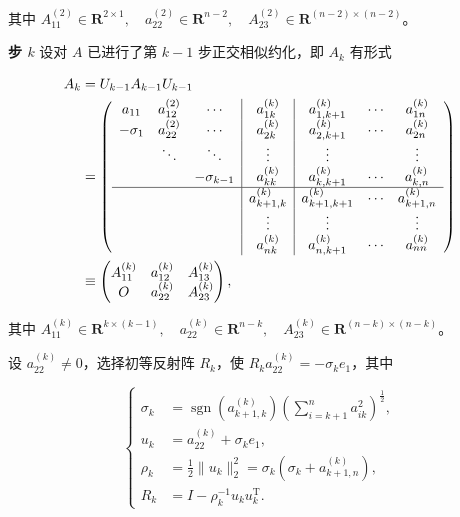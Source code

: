 其中 \(A_{11}^{(2)}\in\mathbf R^{2\times1},\quad a_{22}^{(2)}\in\mathbf R^{n-2},\quad A_{23}^{(2)}\in\mathbf R^{(n-2)\times(n-2)}\)。

\textbf{步 \(k\)} 设对 \(A\) 已进行了第 \(k-1\) 步正交相似约化，即 \(A_k\) 有形式

\[
\begin{aligned}
A_k&=U_{k-1}A_{k-1}U_{k-1}\\
&=\left(\begin{array}{ccc|c|ccc}
a_{11}&a_{12}^{(2)}&\cdots&a_{1k}^{(k)}&a_{1,k+1}^{(k)}&\cdots&a_{1n}^{(k)}\\
-\sigma_1&a_{22}^{(2)}&\cdots&a_{2k}^{(k)}&a_{2,k+1}^{(k)}&\cdots&a_{2n}^{(k)}\\
&\ddots&\ddots&\vdots&\vdots&&\vdots\\
&&-\sigma_{k-1}&a_{kk}^{(k)}&a_{k,k+1}^{(k)}&\cdots&a_{k,n}^{(k)}\\\hline
&&&a_{k+1,k}^{(k)}&a_{k+1,k+1}^{(k)}&\cdots&a_{k+1,n}^{(k)}\\
&&&\vdots&\vdots&&\vdots\\
&&&a_{nk}^{(k)}&a_{n,k+1}^{(k)}&\cdots&a_{nn}^{(k)}
\end{array}\right)\\
&\equiv\begin{pmatrix}
A_{11}^{(k)}&a_{12}^{(k)}&A_{13}^{(k)}\\
O&a_{22}^{(k)}&A_{23}^{(k)}
\end{pmatrix},
\end{aligned}
\]

其中 \(A_{11}^{(k)}\in\mathbf R^{k\times(k-1)},\quad a_{22}^{(k)}\in\mathbf R^{n-k},\quad A_{23}^{(k)}\in\mathbf R^{(n-k)\times(n-k)}\)。

设 \(a_{22}^{(k)}\ne0\)，选择初等反射阵 \(R_k\)，使 \(R_ka_{22}^{(k)}=-\sigma_ke_1\)，其中

\[
\left\{
\begin{aligned}
\sigma_k&=\operatorname{sgn}(a_{k+1,k}^{(k)})\left(\sum_{i=k+1}^na_{ik}^2\right)^{\frac12},\\
u_k&=a_{22}^{(k)}+\sigma_ke_1,\\
\rho_k&=\frac12\|u_k\|_2^2=\sigma_k(\sigma_k+a_{k+1,n}^{(k)}),\\
R_k&=I-\rho_k^{-1}u_ku_k^{\mathrm T}.
\end{aligned}
\right.
\tag{9.3.2}
\]

